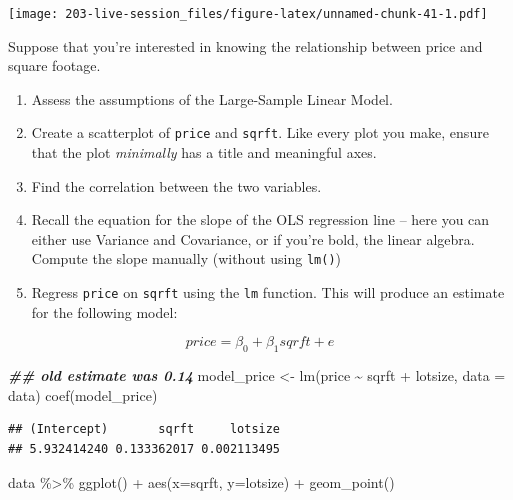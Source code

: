 \documentclass[
]{book}
\newenvironment{Shaded}{\begin{snugshade}}{\end{snugshade}}
\newcommand{\AttributeTok}[1]{\textcolor[rgb]{0.77,0.63,0.00}{#1}}
\newcommand{\DocumentationTok}[1]{\textcolor[rgb]{0.56,0.35,0.01}{\textbf{\textit{#1}}}}
\newcommand{\FunctionTok}[1]{\textcolor[rgb]{0.00,0.00,0.00}{#1}}
\newcommand{\NormalTok}[1]{#1}
\newcommand{\OtherTok}[1]{\textcolor[rgb]{0.56,0.35,0.01}{#1}}
\newcommand{\SpecialCharTok}[1]{\textcolor[rgb]{0.00,0.00,0.00}{#1}}
\theoremstyle{definition}
\theoremstyle{definition}
\theoremstyle{definition}
\theoremstyle{definition}
\theoremstyle{remark}
\begin{document}
\texttt{[image: 203-live-session\_files/figure-latex/unnamed-chunk-41-1.pdf]}

Suppose that you're interested in knowing the relationship between price and square footage.

\begin{enumerate}
\def\labelenumi{\arabic{enumi}.}
\setcounter{enumi}{-1}
\item
  Assess the assumptions of the Large-Sample Linear Model.
\item
  Create a scatterplot of \texttt{price} and \texttt{sqrft}. Like every plot you make, ensure that the plot \emph{minimally} has a title and meaningful axes.
\item
  Find the correlation between the two variables.
\item
  Recall the equation for the slope of the OLS regression line -- here you can either use Variance and Covariance, or if you're bold, the linear algebra. Compute the slope manually (without using \texttt{lm()})
\item
  Regress \texttt{price} on \texttt{sqrft} using the \texttt{lm} function. This will produce an estimate for the following model:
\end{enumerate}

\[ 
price = \beta_{0} + \beta_{1} sqrft + e
\]

\begin{Shaded}
\begin{Highlighting}[]
\DocumentationTok{\#\# old estimate was 0.14}
\NormalTok{model\_price }\OtherTok{\textless{}{-}} \FunctionTok{lm}\NormalTok{(price }\SpecialCharTok{\textasciitilde{}}\NormalTok{ sqrft }\SpecialCharTok{+}\NormalTok{ lotsize, }\AttributeTok{data =}\NormalTok{ data)}
\FunctionTok{coef}\NormalTok{(model\_price)}
\end{Highlighting}
\end{Shaded}

\begin{verbatim}
## (Intercept)       sqrft     lotsize 
## 5.932414240 0.133362017 0.002113495
\end{verbatim}

\begin{Shaded}
\begin{Highlighting}[]
\NormalTok{data }\SpecialCharTok{\%\textgreater{}\%} 
  \FunctionTok{ggplot}\NormalTok{() }\SpecialCharTok{+} 
  \FunctionTok{aes}\NormalTok{(}\AttributeTok{x=}\NormalTok{sqrft, }\AttributeTok{y=}\NormalTok{lotsize) }\SpecialCharTok{+} 
  \FunctionTok{geom\_point}\NormalTok{()}
\end{Highlighting}
\end{Shaded}
\end{document}
